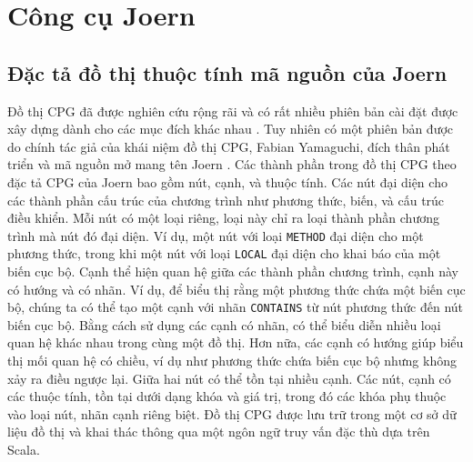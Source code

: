 \section{Công cụ Joern}

\subsection{Đặc tả đồ thị thuộc tính mã nguồn của Joern}


Đồ thị CPG đã được nghiên cứu rộng rãi và có rất nhiều phiên bản cài đặt được xây dựng dành cho các mục đích khác nhau \cite{ kuchler2022representing, weiss2022language}.
Tuy nhiên có một phiên bản được do chính tác giả của khái niệm đồ thị CPG, Fabian Yamaguchi, đích thân phát triển và mã nguồn mở mang tên Joern \cite{joernJoernHunteraposs}.
Các thành phần trong đồ thị CPG theo đặc tả CPG của Joern bao gồm nút, cạnh, và thuộc tính.
Các nút đại diện cho các thành phần cấu trúc của chương trình như phương thức, biến, và cấu trúc điều khiển.
Mỗi nút có một loại riêng, loại này chỉ ra loại thành phần chương trình mà nút đó đại diện.
Ví dụ, một nút với loại \texttt{METHOD} đại diện cho một phương thức, trong khi một nút với loại \texttt{LOCAL} đại diện cho khai báo của một biến cục bộ.
Cạnh thể hiện quan hệ giữa các thành phần chương trình, cạnh này có hướng và có nhãn.
Ví dụ, để biểu thị rằng một phương thức chứa một biến cục bộ, chúng ta có thể tạo một cạnh với nhãn \texttt{CONTAINS} từ nút phương thức đến nút biến cục bộ.
Bằng cách sử dụng các cạnh có nhãn, có thể biểu diễn nhiều loại quan hệ khác nhau trong cùng một đồ thị.
Hơn nữa, các cạnh có hướng giúp biểu thị mối quan hệ có chiều, ví dụ như phương thức chứa biến cục bộ nhưng không xảy ra điều ngược lại.
Giữa hai nút có thể tồn tại nhiều cạnh.
Các nút, cạnh có các thuộc tính, tồn tại dưới dạng khóa và giá trị, trong đó các khóa phụ thuộc vào loại nút, nhãn cạnh riêng biệt.
Đồ thị CPG được lưu trữ trong một cơ sở dữ liệu đồ thị và khai thác thông qua một ngôn ngữ truy vấn đặc thù dựa trên Scala.

